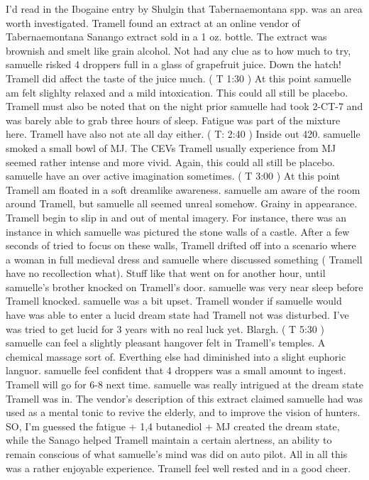 \documentclass[12pt]{book}
\begin{document}
I'd read in the Ibogaine entry by Shulgin that Tabernaemontana spp. was an area worth investigated. Tramell found an extract at an online vendor of Tabernaemontana Sanango extract sold in a 1 oz. bottle. The extract was brownish and smelt like grain alcohol. Not had any clue as to how much to try, samuelle risked 4 droppers full in a glass of grapefruit juice. Down the hatch! Tramell did affect the taste of the juice much. ( T 1:30 ) At this point samuelle am felt slighlty relaxed and a mild intoxication. This could all still be placebo. Tramell must also be noted that on the night prior samuelle had took 2-CT-7 and was barely able to grab three hours of sleep. Fatigue was part of the mixture here. Tramell have also not ate all day either. ( T: 2:40 ) Inside out 420. samuelle smoked a small bowl of MJ. The CEVs Tramell usually experience from MJ seemed rather intense and more vivid. Again, this could all still be placebo. samuelle have an over active imagination sometimes. ( T 3:00 ) At this point Tramell am floated in a soft dreamlike awareness. samuelle am aware of the room around Tramell, but samuelle all seemed unreal somehow. Grainy in appearance. Tramell begin to slip in and out of mental imagery. For instance, there was an instance in which samuelle was pictured the stone walls of a castle. After a few seconds of tried to focus on these walls, Tramell drifted off into a scenario where a woman in full medieval dress and samuelle where discussed something ( Tramell have no recollection what). Stuff like that went on for another hour, until samuelle's brother knocked on Tramell's door. samuelle was very near sleep before Tramell knocked. samuelle was a bit upset. Tramell wonder if samuelle would have was able to enter a lucid dream state had Tramell not was disturbed. I've was tried to get lucid for 3 years with no real luck yet. Blargh. ( T 5:30 ) samuelle can feel a slightly pleasant hangover felt in Tramell's temples. A chemical massage sort of. Everthing else had diminished into a slight euphoric languor. samuelle feel confident that 4 droppers was a small amount to ingest. Tramell will go for 6-8 next time. samuelle was really intrigued at the dream state Tramell was in. The vendor's description of this extract claimed samuelle had was used as a mental tonic to revive the elderly, and to improve the vision of hunters. SO, I'm guessed the fatigue + 1,4 butanediol + MJ created the dream state, while the Sanago helped Tramell maintain a certain alertness, an ability to remain conscious of what samuelle's mind was did on auto pilot. All in all this was a rather enjoyable experience. Tramell feel well rested and in a good cheer.
\end{document}
